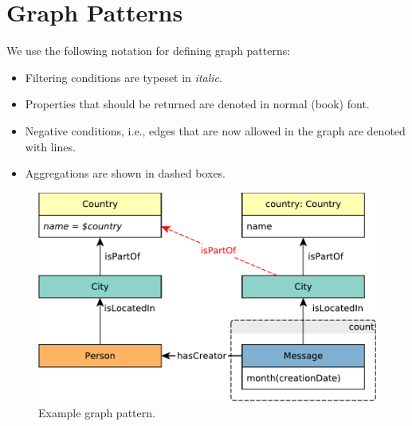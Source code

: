 \section{Graph Patterns}

We use the following notation for defining graph patterns:

\begin{itemize}
	\item Filtering conditions are typeset in \textit{italic}.
	\item Properties that should be returned are denoted in normal (book) font.
	\item Negative conditions, i.e., edges that are now allowed in the graph are denoted with \textcolor{red}{} lines.
	\item Aggregations are shown in dashed boxes.
\end{itemize}

\begin{figure}[hbp]
	\begin{center}
		\includegraphics[scale=\patternscale,margin=0cm .2cm]{patterns/bi-read-23}
		\caption{Example graph pattern.}
		\label{fig:example-graph-pattern}
	\end{center}
\end{figure}
